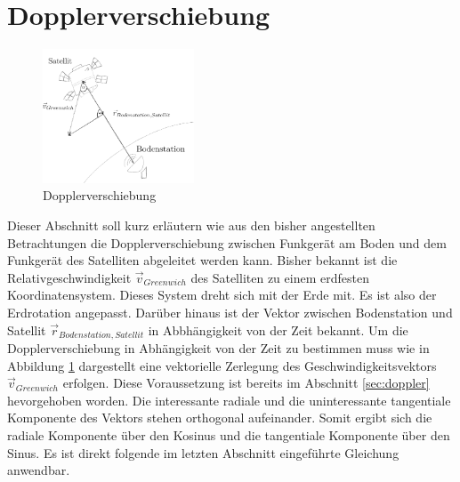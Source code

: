 \section{Dopplerverschiebung}
\begin{figure}[h]                                                                           %
	\centering                                                                            	%
	\includegraphics[width=0.4\textwidth]{./images/doppler.jpg}              			    %
	\caption[Dopplerverschiebung]{Dopplerverschiebung}                        													%
	\label{fig:doppler}                                                                        %
\end{figure}                                                                              	%
Dieser Abschnitt soll kurz erläutern wie aus den bisher angestellten Betrachtungen die Dopplerverschiebung zwischen Funkgerät am Boden und dem Funkgerät des Satelliten abgeleitet werden kann. Bisher bekannt ist die Relativgeschwindigkeit \ensuremath{\vec{v}_{Greenwich}} des Satelliten zu einem erdfesten Koordinatensystem. Dieses System dreht sich mit der Erde mit. Es ist also der Erdrotation angepasst. Darüber hinaus ist der Vektor zwischen Bodenstation und Satellit \ensuremath{\vec{r}_{Bodenstation,Satellit}} in Abbhängigkeit von der Zeit bekannt. 
\newpar
Um die Dopplerverschiebung in Abhängigkeit von der Zeit zu bestimmen muss wie in Abbildung \ref{fig:doppler} dargestellt eine vektorielle Zerlegung des Geschwindigkeitsvektors \ensuremath{\vec{v}_{Greenwich}} erfolgen. Diese Voraussetzung ist bereits im Abschnitt \ref{sec:doppler} hevorgehoben worden. Die interessante radiale und die uninteressante tangentiale Komponente des Vektors stehen orthogonal aufeinander. Somit ergibt sich die radiale Komponente über den Kosinus und die tangentiale Komponente über den Sinus. Es ist direkt folgende im letzten Abschnitt eingeführte Gleichung anwendbar.      
